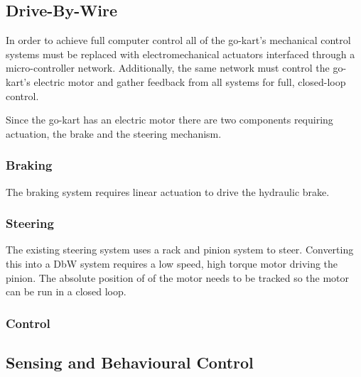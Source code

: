 \subsection{Drive-By-Wire}
In order to achieve full computer control all of the go-kart's mechanical control systems must be replaced with electromechanical actuators interfaced through a micro-controller network. Additionally, the same network must control the go-kart's electric motor and gather feedback from all systems for full, closed-loop control.

Since the go-kart has an electric motor there are two components requiring actuation, the brake and the steering mechanism.

\subsubsection{Braking}
The braking system requires linear actuation to drive the hydraulic  brake. 

\subsubsection{Steering}
The existing steering system uses a rack and pinion system to steer. Converting this into a DbW system requires a low speed, high torque motor driving the pinion. The absolute position of of the motor needs to be tracked so the motor can be run in a closed loop.

\subsubsection{Control}


\subsection{Sensing and Behavioural Control}

